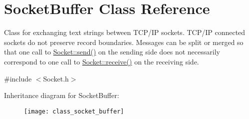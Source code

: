 \hypertarget{class_socket_buffer}{}\section{Socket\+Buffer Class Reference}
\label{class_socket_buffer}


Class for exchanging text strings between T\+C\+P/\+IP sockets. T\+C\+P/\+IP connected sockets do not preserve record boundaries. Messages can be split or merged so that one call to \hyperlink{class_socket_a9275eacdb64056a53cf4b9cf54cd2f1a}{Socket\+::send()} on the sending side does not necessarily correspond to one call to \hyperlink{class_socket_aa5e98b6f2c4e26fcf90d71c8386fc09d}{Socket\+::receive()} on the receiving side.  




{\ttfamily \#include $<$Socket.\+h$>$}

Inheritance diagram for Socket\+Buffer\+:\begin{figure}[H]
\begin{center}
\leavevmode
\texttt{[image: class\_socket\_buffer]}
\end{center}
\end{figure}
